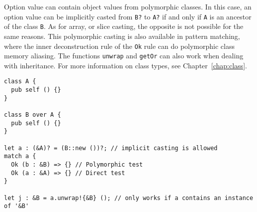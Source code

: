 Option value can contain object values from polymorphic classes. In this case,
an option value can be implicitly casted from \texttt{B?} to \texttt{A?} if and
only if \texttt{A} is an ancestor of the class \texttt{B}. As for array, or
slice casting, the opposite is not possible for the same reasons. This
polymorphic casting is also available in pattern matching, where the inner
deconstruction rule of the \texttt{Ok} rule can do polymorphic class memory
aliasing. The functions \texttt{unwrap} and \texttt{getOr} can also work when
dealing with inheritance. For more information on class types, see
Chapter~\ref{chap:class}.

\begin{lstlisting}[style=coloredverbatim]
class A {
  pub self () {}
}

class B over A {
  pub self () {}
}

let a : (&A)? = (B::new ())?; // implicit casting is allowed
match a {
  Ok (b : &B) => {} // Polymorphic test
  Ok (a : &A) => {} // Direct test
}

let j : &B = a.unwrap!{&B} (); // only works if a contains an instance of '&B'
\end{lstlisting}
